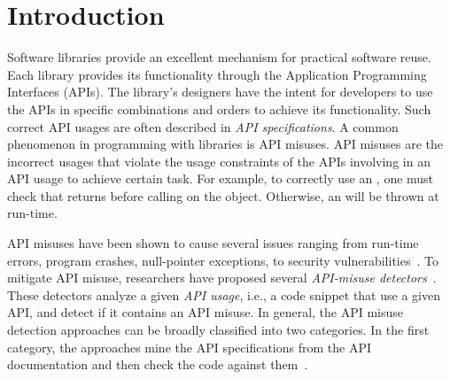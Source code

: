 \section{Introduction}
\label{sec:intro}

Software libraries provide an excellent mechanism for practical
software reuse. Each library provides its functionality through the
Application Programming Interfaces (APIs). The library's designers
have the intent for developers to use the APIs in specific
combinations and orders to achieve its functionality. Such correct API
usages are often described in {\em API specifications}. A common
phenomenon in programming with libraries is API misuses. API misuses
are the incorrect usages that violate the usage constraints of the
APIs involving in an API usage to achieve certain task.  For example,
to correctly use an , one must check that
 returns  before calling
 on the  object. Otherwise,
an  will be thrown at run-time.

API misuses have been shown to cause several issues ranging from
run-time errors, program crashes, null-pointer exceptions, to security
vulnerabilities~\cite{mudetect-msr19,MM13,SHA15,FHMB+12,EBFK13,NKMB16,GIJA+12,ANNN+16}. To
mitigate API misuse, researchers have proposed several
\emph{API-misuse
detectors}~\cite{LZ05,L07,WZL07,RGJ07,NNP+09,AX09,TX09,TX09b,WZ11,MM13,NPVN16}.
These detectors analyze a given \emph{API usage}, i.e., a code snippet
that use a given API, and detect if it contains an API misuse.  In
general, the API misuse detection approaches can be broadly classified
into two categories. In the first category, the approaches mine the
API specifications from the API documentation and then check the code
against them~\cite{ase22,jdoctor-issta18,zhou-icse17,c2s-fse20}.


%



